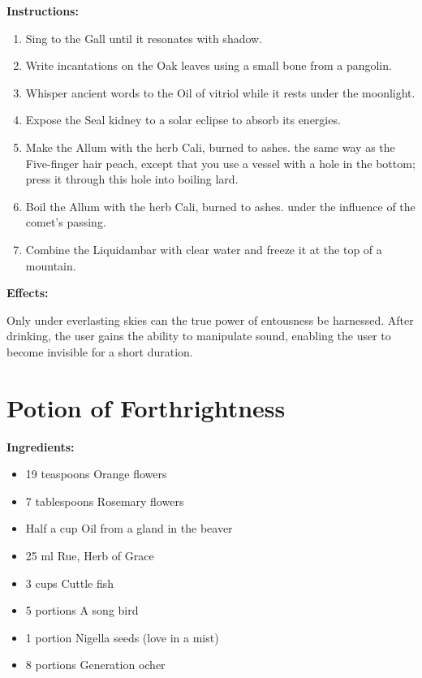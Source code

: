 \documentclass{article}
\begin{document}
\textbf{Instructions:}

\begin{enumerate}
  \item Sing to the Gall until it resonates with shadow.
  \item Write incantations on the Oak leaves using a small bone from a pangolin.
  \item Whisper ancient words to the Oil of vitriol while it rests under the moonlight.
  \item Expose the Seal kidney to a solar eclipse to absorb its energies.
  \item Make the Allum with the herb Cali, burned to ashes. the same way as the Five-finger hair peach, except that you use a vessel with a hole in the bottom; press it through this hole into boiling lard.
  \item Boil the Allum with the herb Cali, burned to ashes. under the influence of the comet’s passing.
  \item Combine the Liquidambar with clear water and freeze it at the top of a mountain.
\end{enumerate}

\textbf{Effects:}

Only under everlasting skies can the true power of entousness be harnessed. After drinking, the user gains the ability to manipulate sound, enabling the user to become invisible for a short duration.

\newpage
\section*{Potion of Forthrightness}

\textbf{Ingredients:}

\begin{itemize}
  \item 19 teaspoons Orange flowers
  \item 7 tablespoons Rosemary flowers
  \item Half a cup Oil from a gland in the beaver
  \item 25 ml Rue, Herb of Grace
  \item 3 cups Cuttle fish
  \item 5 portions A song bird
  \item 1 portion Nigella seeds (love in a mist)
  \item 8 portions Generation ocher
\end{itemize}
\end{document}
